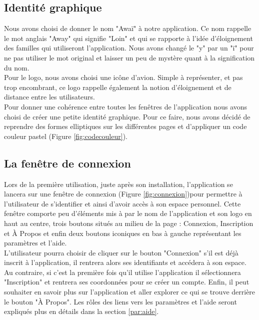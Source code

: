 \documentclass[11pt]{article}
\begin{document}
\subsection{Identité graphique}
Nous avons choisi de donner le nom "Awaï" à notre application. Ce nom rappelle le mot anglais "Away" qui signifie "Loin" et qui se rapporte à l'idée d'éloignement des familles qui utiliseront l'application. Nous avons changé le "y" par un "ï" pour ne pas utiliser le mot original et laisser un peu de mystère quant à la signification du nom. ~\\

Pour le logo, nous avons choisi une icône d'avion. Simple à représenter, et pas trop encombrant, ce logo rappelle également la notion d'éloignement et de distance entre les utilisateurs.~\\

Pour donner une cohérence entre toutes les fenêtres de l'application nous avons choisi de créer une petite identité graphique. Pour ce faire, nous avons décidé de reprendre des formes elliptiques  sur les différentes pages et d'appliquer un code couleur pastel (Figure \ref{fig:codecouleur}).
\subsection{La fenêtre de connexion}
Lors de la première utilisation, juste après son installation, l'application se lancera sur une fenêtre de connexion (Figure \ref{fig:connexion})pour permettre à l'utilisateur de s'identifier et ainsi d'avoir accès à son espace personnel. Cette fenêtre comporte peu d'éléments mis à par le nom de l'application et son logo en haut au centre, trois boutons situés au milieu de la page : Connexion, Inscription et À Propos et enfin deux boutons iconiques en bas à gauche représentant les paramètres et l'aide.~\\ 

L'utilisateur pourra choisir de cliquer sur le bouton "Connexion" s'il est déjà inscrit à l'application, il rentrera alors ses identifiants et accédera à son espace. Au contraire, si c'est la première fois qu'il utilise l'application il sélectionnera "Inscription" et rentrera ses coordonnées pour se créer un compte. Enfin, il peut souhaiter en savoir plus sur l'application et aller explorer ce qui se trouve derrière le bouton "À Propos".  Les rôles des liens vers les paramètres et l'aide seront expliqués plus en détails dans la section \ref{par:aide}.
\end{document}
